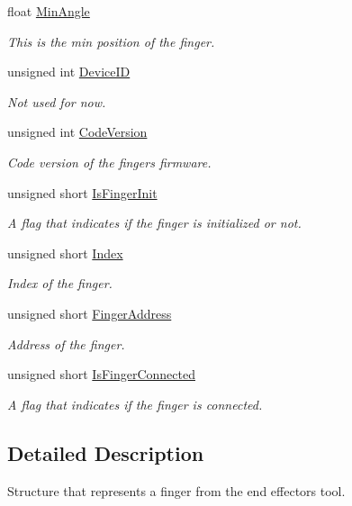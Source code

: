\begin{DoxyCompactItemize}
float \hyperlink{struct_finger_a0dce6e32d94cfbad9313446c67138de0}{Min\+Angle}
\begin{DoxyCompactList}\small\item\em This is the min position of the finger. \end{DoxyCompactList}\item 
unsigned int \hyperlink{struct_finger_a933827723641f328b9d640ed9fa579fe}{Device\+ID}
\begin{DoxyCompactList}\small\item\em Not used for now. \end{DoxyCompactList}\item 
unsigned int \hyperlink{struct_finger_a39f1fa57fc87fe6bcb09bc43d16a6389}{Code\+Version}
\begin{DoxyCompactList}\small\item\em Code version of the finger\textquotesingle{}s firmware. \end{DoxyCompactList}\item 
unsigned short \hyperlink{struct_finger_a234ae5da6a6f0fd24538c80b8b339c18}{Is\+Finger\+Init}
\begin{DoxyCompactList}\small\item\em A flag that indicates if the finger is initialized or not. \end{DoxyCompactList}\item 
unsigned short \hyperlink{struct_finger_ab64ec8787b32917531d6ac4e0c8c3342}{Index}
\begin{DoxyCompactList}\small\item\em Index of the finger. \end{DoxyCompactList}\item 
unsigned short \hyperlink{struct_finger_aba71b81dc24eb8f34254954707789cd4}{Finger\+Address}
\begin{DoxyCompactList}\small\item\em Address of the finger. \end{DoxyCompactList}\item 
unsigned short \hyperlink{struct_finger_ae5f0d71293de64ba7d7dd43b4275b439}{Is\+Finger\+Connected}
\begin{DoxyCompactList}\small\item\em A flag that indicates if the finger is connected. \end{DoxyCompactList}\end{DoxyCompactItemize}


\subsection{Detailed Description}
Structure that represents a finger from the end effector\textquotesingle{}s tool. 

